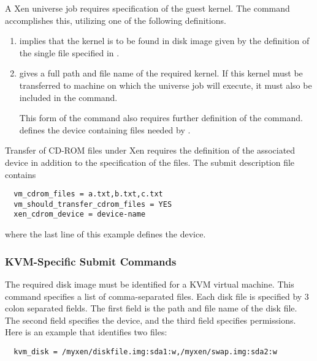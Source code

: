 A Xen  universe job requires specification of the
guest kernel. 
The  command accomplishes this, 
utilizing one of the following definitions.
\begin{enumerate}
\item {} implies that the kernel
  is to be found in disk image given by the definition of the single file
  specified in . 

\item {} gives a full path and
  file name of the required kernel.  If this kernel must be transferred
  to machine on which the  universe job will execute,
  it must also be included in the  command. 

  This form of the  command also requires further
  definition of the  command.
   defines the device containing files needed by
  .

\end{enumerate}

Transfer of CD-ROM files under Xen requires the definition of
the associated device in addition to the specification of the
files.
The submit description file contains
\begin{verbatim}
  vm_cdrom_files = a.txt,b.txt,c.txt
  vm_should_transfer_cdrom_files = YES
  xen_cdrom_device = device-name
\end{verbatim}
where the last line of this example defines the device.

\subsubsection{\label{sec:vm-KVMsubmitfile}KVM-Specific Submit Commands}

The required disk image must be identified for a KVM virtual machine.
This  command specifies a list of comma-separated files.
Each disk file is specified by 3 colon separated fields.
The first field is the path and file name of the disk file.
The second field specifies the device,
and the third field specifies permissions.
Here is an example that identifies two files:
\footnotesize
\begin{verbatim}
  kvm_disk = /myxen/diskfile.img:sda1:w,/myxen/swap.img:sda2:w
\end{verbatim}
\normalsize

